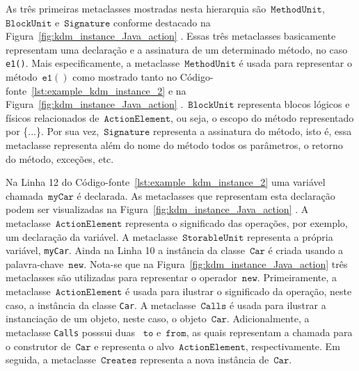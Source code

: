 As três primeiras metaclasses mostradas nesta hierarquia são~$\mathtt{MethodUnit}$,~$\mathtt{BlockUnit}$ e~$\mathtt{Signature}$ conforme destacado na  Figura~\ref{fig:kdm_instance_Java_action} . Essas três metaclasses basicamente representam uma declaração e a assinatura de um determinado método, no caso \texttt{e1()}. Mais especificamente, a metaclasse~$\mathtt{MethodUnit}$ é usada para representar o método~$\mathtt{e1()}$ como mostrado tanto no Código-fonte~\ref{lst:example_kdm_instance_2}  e na Figura~\ref{fig:kdm_instance_Java_action} .~$\mathtt{BlockUnit}$ representa blocos lógicos e físicos relacionados de~$\mathtt{ActionElement}$, ou seja, o escopo do método representado por \{...\}. Por sua vez,~$\mathtt{Signature}$ representa a assinatura do método, isto é, essa metaclasse representa além do nome do método todos os parâmetros, o retorno do método, exceções, etc.	


Na Linha 12 do Código-fonte~\ref{lst:example_kdm_instance_2}  uma variável chamada~$\mathtt{myCar}$ é declarada. As metaclasses que representam esta declaração podem ser visualizadas na Figura~\ref{fig:kdm_instance_Java_action} . A metaclasse~$\mathtt{ActionElement}$ representa o significado das operações, por exemplo, um declaração da variável. A metaclasse~$\mathtt{StorableUnit}$ representa a própria variável, \texttt{myCar}. Ainda na Linha 10  a instância da classe~$\mathtt{Car}$ é criada usando a palavra-chave~$\mathtt{new}$. Nota-se que na Figura~\ref{fig:kdm_instance_Java_action}  três metaclasses são utilizadas para representar o operador~$\mathtt{new}$. Primeiramente, a metaclasse~$\mathtt{ActionElement}$ é usada para ilustrar o significado da operação, neste caso, a instância da classe \texttt{Car}. A metaclasse~$\mathtt{Calls}$ é usada para ilustrar a instanciação de um objeto, neste caso, o objeto~$\mathtt{Car}$. Adicionalmente, a metaclasse \texttt{Calls} posssui duas ~$\mathtt{to}$ e~$\mathtt{from}$, as quais representam a chamada para o construtor de~$\mathtt{Car}$ e representa o alvo~$\mathtt{ActionElement}$, respectivamente. Em seguida, a metaclasse~$\mathtt{Creates}$ representa a nova instância de~$\mathtt{Car}$.

